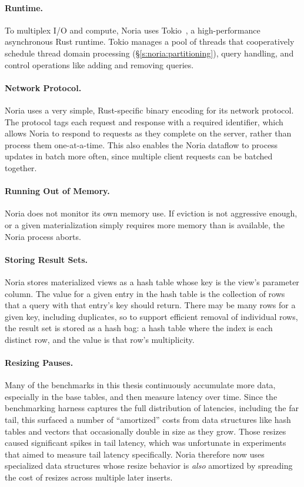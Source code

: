 \paragraph{Runtime.}
To multiplex I/O and compute, Noria uses Tokio~\cite{tokio}, a high-performance
asynchronous Rust runtime. Tokio manages a pool of threads that cooperatively
schedule thread domain processing (\S\ref{s:noria:partitioning}), query
handling, and control operations like adding and removing queries.

\paragraph{Network Protocol.}
Noria uses a very simple, Rust-specific binary encoding for its network
protocol. The protocol tags each request and response with a required
identifier, which allows Noria to respond to requests as they complete on the
server, rather than process them one-at-a-time. This also enables the Noria
dataflow to process updates in batch more often, since multiple client requests
can be batched together.

\paragraph{Running Out of Memory.}
Noria does not monitor its own memory use. If eviction is not aggressive enough,
or a given materialization simply requires more memory than is available, the
Noria process aborts.

\paragraph{Storing Result Sets.}
Noria stores materialized views as a hash table whose key is the view's
parameter column. The value for a given entry in the hash table is the
collection of rows that a query with that entry's key should return. There
may be many rows for a given key, including duplicates, so to support efficient
removal of individual rows, the result set is stored as a hash bag: a hash table
where the index is each distinct row, and the value is that row's multiplicity.

\paragraph{Resizing Pauses.}
Many of the benchmarks in this thesis continuously accumulate more data,
especially in the base tables, and then measure latency over time. Since the
benchmarking harness captures the full distribution of latencies, including the
far tail, this surfaced a number of ``amortized'' costs from data structures
like hash tables and vectors that occasionally double in size as they grow.
Those resizes caused significant spikes in tail latency, which was unfortunate
in experiments that aimed to measure tail latency specifically. Noria therefore
now uses specialized data structures whose resize behavior is \emph{also}
amortized by spreading the cost of resizes across multiple later inserts.

